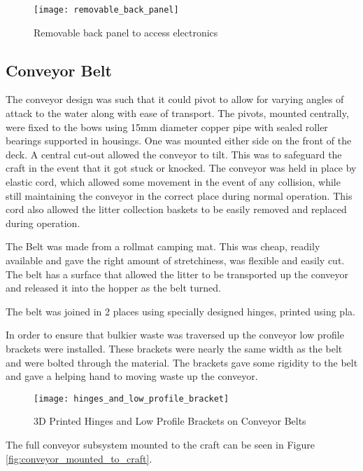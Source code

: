 \documentclass [11pt]{article}
\begin{document}
\begin{figure}[H]
\centerline{\texttt{[image: removable\_back\_panel]}}
\caption{Removable back panel to access electronics}
\label{fig:removable_back_panel}
\end{figure}

\subsection{Conveyor Belt}

The conveyor design was such that it could pivot to allow for varying angles of attack to the water along with ease of transport. The pivots, mounted centrally, were fixed to the bows using 15mm diameter copper pipe with sealed roller bearings supported in housings.  One was mounted either side on the front of the deck. A central cut-out allowed the conveyor to tilt. This was to safeguard the craft in the event that it got stuck or knocked. The conveyor was held in place by elastic cord, which allowed some movement in the event of any collision, while still maintaining the conveyor in the correct place during normal operation. This cord also allowed the litter collection baskets to be easily removed and replaced during operation. 

The Belt was made from a \gls{rollmat} camping mat. This was cheap, readily available and gave the right amount of stretchiness, was flexible and easily cut. The belt has a surface that allowed the litter to be transported up the conveyor and released it into the hopper as the belt turned. 

The belt was joined in 2 places using specially designed hinges, printed using \gls{pla}.

In order to ensure that bulkier waste was traversed up the conveyor low profile brackets were installed. These brackets were nearly the same width as the belt and were bolted through the material. The brackets gave some rigidity to the belt and gave a helping hand to moving waste up the conveyor.

\begin{figure}[H]
\centerline{\texttt{[image: hinges\_and\_low\_profile\_bracket]}}
\caption{3D Printed Hinges and Low Profile Brackets on Conveyor Belts}
\label{fig:hinges_and_low_profile_bracket}
\end{figure}

The full conveyor subsystem mounted to the craft can be seen in Figure \ref{fig:conveyor_mounted_to_craft}.
\end{document}
